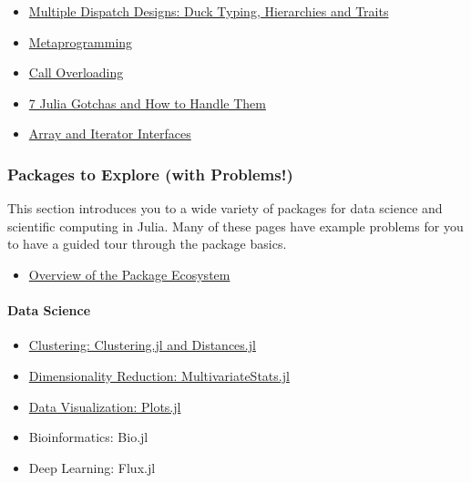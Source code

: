 \documentclass[11pt]{article}
\providecommand{\tightlist}{%
      \setlength{\itemsep}{0pt}\setlength{\parskip}{0pt}}
\begin{document}
\begin{itemize}
\tightlist
\item
  \href{http://ucidatascienceinitiative.github.io/IntroToJulia/Html/DispatchDesigns}{Multiple
  Dispatch Designs: Duck Typing, Hierarchies and Traits}
\item
  \href{http://ucidatascienceinitiative.github.io/IntroToJulia/Html/Metaprogramming}{Metaprogramming}
\item
  \href{http://ucidatascienceinitiative.github.io/IntroToJulia/Html/CallOverloading}{Call
  Overloading}
\item
  \href{http://www.stochasticlifestyle.com/7-julia-gotchas-handle/}{7
  Julia Gotchas and How to Handle Them}
\item
  \href{http://ucidatascienceinitiative.github.io/IntroToJulia/Html/ArrayIteratorInterfaces}{Array
  and Iterator Interfaces}
\end{itemize}

\subsubsection{Packages to Explore (with
Problems!)}\label{packages-to-explore-with-problems}

This section introduces you to a wide variety of packages for data
science and scientific computing in Julia. Many of these pages have
example problems for you to have a guided tour through the package
basics.

\begin{itemize}
\tightlist
\item
  \href{http://ucidatascienceinitiative.github.io/IntroToJulia/Html/PackageEcosystem}{Overview
  of the Package Ecosystem}
\end{itemize}

\paragraph{Data Science}\label{data-science}

\begin{itemize}
\tightlist
\item
  \href{http://ucidatascienceinitiative.github.io/IntroToJulia/Html/Clustering}{Clustering:
  Clustering.jl and Distances.jl}
\item
  \href{http://ucidatascienceinitiative.github.io/IntroToJulia/Html/DimensionalityReduction}{Dimensionality
  Reduction: MultivariateStats.jl}
\item
  \href{http://ucidatascienceinitiative.github.io/IntroToJulia/Html/PlotsJL}{Data
  Visualization: Plots.jl}
\item
  Bioinformatics: Bio.jl
\item
  Deep Learning: Flux.jl
\end{itemize}
\end{document}
